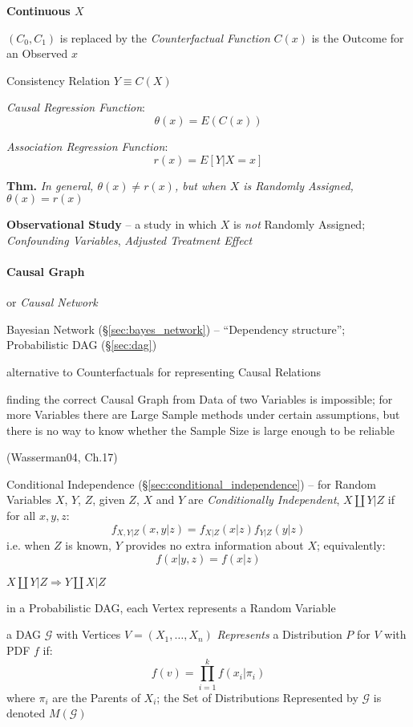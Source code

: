 \textbf{Continuous $X$}

$(C_0, C_1)$ is replaced by the \emph{Counterfactual Function} $C(x)$ is the
Outcome for an Observed $x$

Consistency Relation $Y \equiv C(X)$

\emph{Causal Regression Function}:
\[
  \theta(x) = E(C(x))
\]

\emph{Association Regression Function}:
\[
  r(x) = E[Y | X = x]
\]

\textbf{Thm.} \emph{In general, $\theta(x) \neq r(x)$, but when $X$ is Randomly
  Assigned, $\theta(x) = r(x)$}


\textbf{Observational Study} -- a study in which $X$ is \emph{not} Randomly
Assigned; \emph{Confounding Variables}, \emph{Adjusted Treatment Effect}



\paragraph{Causal Graph}\label{sec:causal_graph}\hfill

or \emph{Causal Network}

\fist Bayesian Network (\S\ref{sec:bayes_network}) -- ``Dependency structure'';
Probabilistic DAG (\S\ref{sec:dag})

alternative to Counterfactuals for representing Causal Relations

finding the correct Causal Graph from Data of two Variables is impossible; for
more Variables there are Large Sample methods under certain assumptions, but
there is no way to know whether the Sample Size is large enough to be reliable

(Wasserman04, Ch.17)

Conditional Independence (\S\ref{sec:conditional_independence}) -- for Random
Variables $X$, $Y$, $Z$, given $Z$, $X$ and $Y$ are \emph{Conditionally
  Independent}, $X \coprod Y | Z$ if for all $x,y,z$:
\[
  f_{X,Y|Z}(x,y|z) = f_{X|Z}(x|z) f_{Y|Z}(y|z)
\]
i.e. when $Z$ is known, $Y$ provides no extra information about $X$;
equivalently:
\[
  f(x|y, z) = f(x|z)
\]

$X \coprod Y | Z \Rightarrow Y \coprod X | Z$

in a Probabilistic DAG, each Vertex represents a Random Variable

a DAG $\mathcal{G}$ with Vertices $V = (X_1, \ldots, X_n)$ \emph{Represents} a
Distribution $P$ for $V$ with PDF $f$ if:
\[
  f(v) = \prod_{i=1}^k f(x_i | \pi_i)
\]
where $\pi_i$ are the Parents of $X_i$; the Set of Distributions Represented by
$\mathcal{G}$ is denoted $M(\mathcal{G})$

